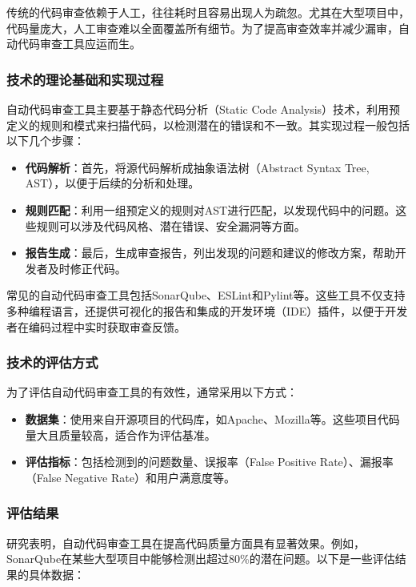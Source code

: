 \documentclass{article}
\begin{document}
传统的代码审查依赖于人工，往往耗时且容易出现人为疏忽。尤其在大型项目中，代码量庞大，人工审查难以全面覆盖所有细节。为了提高审查效率并减少漏审，自动代码审查工具应运而生。

\subsubsection{技术的理论基础和实现过程}

自动代码审查工具主要基于静态代码分析（Static Code Analysis）技术，利用预定义的规则和模式来扫描代码，以检测潜在的错误和不一致。其实现过程一般包括以下几个步骤：

\begin{itemize}
    \item \textbf{代码解析}：首先，将源代码解析成抽象语法树（Abstract Syntax Tree, AST），以便于后续的分析和处理。
    \item \textbf{规则匹配}：利用一组预定义的规则对AST进行匹配，以发现代码中的问题。这些规则可以涉及代码风格、潜在错误、安全漏洞等方面。
    \item \textbf{报告生成}：最后，生成审查报告，列出发现的问题和建议的修改方案，帮助开发者及时修正代码。
\end{itemize}

常见的自动代码审查工具包括SonarQube、ESLint和Pylint等。这些工具不仅支持多种编程语言，还提供可视化的报告和集成的开发环境（IDE）插件，以便于开发者在编码过程中实时获取审查反馈。

\subsubsection{技术的评估方式}

为了评估自动代码审查工具的有效性，通常采用以下方式：

\begin{itemize}
    \item \textbf{数据集}：使用来自开源项目的代码库，如Apache、Mozilla等。这些项目代码量大且质量较高，适合作为评估基准。
    \item \textbf{评估指标}：包括检测到的问题数量、误报率（False Positive Rate）、漏报率（False Negative Rate）和用户满意度等。
\end{itemize}

\subsubsection{评估结果}

研究表明，自动代码审查工具在提高代码质量方面具有显著效果。例如，SonarQube在某些大型项目中能够检测出超过80\%的潜在问题。以下是一些评估结果的具体数据：
\end{document}
